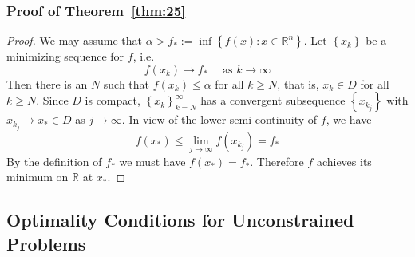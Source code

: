 \subsubsection{Proof of Theorem~\ref{thm:25}}
\label{appendix:thm25}
\begin{proof}
We may assume that $\alpha>f_{*}:=\inf \left\{f(x): x \in \mathbb{R}^{n}\right\}$. Let $\left\{x_{k}\right\}$ be a minimizing sequence for $f$, i.e.
$$
f\left(x_{k}\right) \rightarrow f_{*} \quad \textrm { as }  k \rightarrow \infty
$$
Then there is an $N$ such that $f(x_k) \leq \alpha$ for all $k \geq N$, that is, $x_k \in D$ for all $k \geq N$. Since $D$ is compact, $\left\{x_{k}\right\}_{k=N}^{\infty}$ has a convergent subsequence $\left\{x_{k_j}\right\}$ with $x_{k_{j}} \rightarrow x_{*} \in D$ as $j \rightarrow \infty$. In view of the lower semi-continuity of $f$, we have
$$
f\left(x_{*}\right) \leq \lim _{j \rightarrow \infty} f\left(x_{k_{j}}\right)=f_{*}
$$
By the definition of $f_*$ we must have $f(x_{*}) = f_*$. Therefore $f$ achieves its minimum on $\mathbb{R}$ at $x_{*}$.  
\end{proof}
\subsection{Optimality Conditions for Unconstrained Problems}
